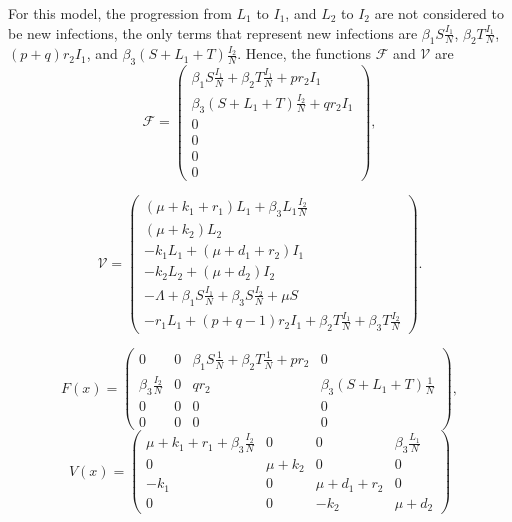 For this model, the progression from $L_1$ to $I_1$, and $L_2$ to $I_2$ are 
not considered to be new infections, the only terms that represent new infections
are $ \beta_{1} S \frac{I_1}{N}$, $\beta_{2} T \frac{I_1}{N}$,  $(p + q )r_2 I_1$, and
$\beta_{3} (S + L_{1} + T)\frac{I_2}{N} $. Hence, the functions $\mathscr{F}$ and 
$\mathscr{V}$ are
\begin{equation*}
    \mathscr{F} = 
        \begin{pmatrix}
            \beta_{1} S \frac{I_1}{N} + \beta_{2} T \frac{I_1}{N} + p r_2 I_1 \\
            \beta_{3} (S + L_{1} + T)\frac{I_2}{N} + q r_2 I_1 \\
            0 \\
            0 \\
            0 \\
            0
        \end{pmatrix},
\end{equation*}

\begin{equation*}
    \mathscr{V} = 
        \begin{pmatrix}
            (\mu + k_1 + r_1)L_{1} +  \beta_{3} L_{1}\frac{I_2}{N} \\
            (\mu + k_2)L_2 \\
            - k_1 L_{1} + (\mu + d_1 + r_2)I_1 \\
            - k_2 L_2 + (\mu + d_2)I_2 \\
            - \Lambda + \beta_{1} S \frac{I_1}{N} + \beta_{3}S\frac{I_2}{N} + \mu S \\
            - r_1 L_{1} + (p+q - 1)r_2 I_1 + \beta_{2} T \frac{I_1}{N} + \beta_{3}T\frac{I_2}{N}  
        \end{pmatrix}.
\end{equation*}

\begin{equation*}
    F(x) = 
        \begin{pmatrix}
            0 & 0 & \beta_{1} S \frac{1}{N} + \beta_{2} T \frac{1}{N} + p r_2 & 0 \\
            \beta_{3}\frac{I_2}{N} & 0 &   q r_2  &   \beta_{3} (S + L_{1} + T)\frac{1}{N} \\
    		0 & 0 & 0 & 0 \\
		    0 & 0 & 0 & 0
        \end{pmatrix},
\end{equation*}
\begin{equation*}
    V(x) =
        \begin{pmatrix}
            \mu + k_1 + r_1 +  \beta_{3} \frac{I_2}{N} & 0 & 0 & \beta_{3} \frac{L_1}{N} \\
            0 & \mu + k_2 & 0 & 0 \\
            -k_1 & 0 & \mu + d_1 + r_2 & 0 \\
            0 & 0 & -k_2 & \mu + d_2 
        \end{pmatrix}
\end{equation*}

